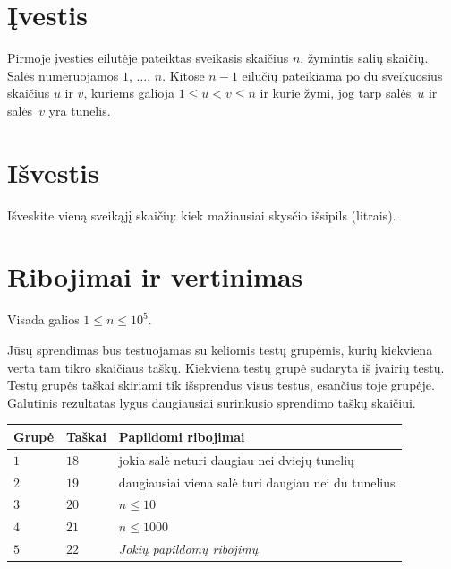 \section*{Įvestis}

Pirmoje įvesties eilutėje pateiktas sveikasis skaičius $n$, žymintis salių skaičių.
Salės numeruojamos $1$, $\ldots$, $n$.
Kitose $n-1$ eilučių pateikiama po du sveikuosius skaičius $u$ ir $v$, kuriems galioja
$1\leq u < v \leq n$ %
ir kurie žymi, jog tarp salės~$u$ ir salės~$v$ yra tunelis.

\section*{Išvestis}

Išveskite vieną sveikąjį skaičių: kiek mažiausiai skysčio išsipils (litrais).

\section*{Ribojimai ir vertinimas}

Visada galios
$1\leq n\leq 10^5$. %

Jūsų sprendimas bus testuojamas su keliomis testų grupėmis, kurių kiekviena verta tam tikro skaičiaus taškų.
Kiekviena testų grupė sudaryta iš įvairių testų.
Testų grupės taškai skiriami tik išsprendus visus testus, esančius toje grupėje.
Galutinis rezultatas lygus daugiausiai surinkusio sprendimo taškų skaičiui.

\medskip
\begin{tabular}{lll}
Grupė & Taškai & Papildomi ribojimai \\\hline
  $1$ & $18$ & jokia salė neturi daugiau nei dviejų tunelių\\
  $2$ & $19$ & daugiausiai viena salė turi daugiau nei du tunelius\\
  $3$ & $20$ & $n\leq 10$\\
  $4$ & $21$ & $n\leq 1000$\\
  $5$ & $22$ & \emph{Jokių papildomų ribojimų}
\end{tabular}
